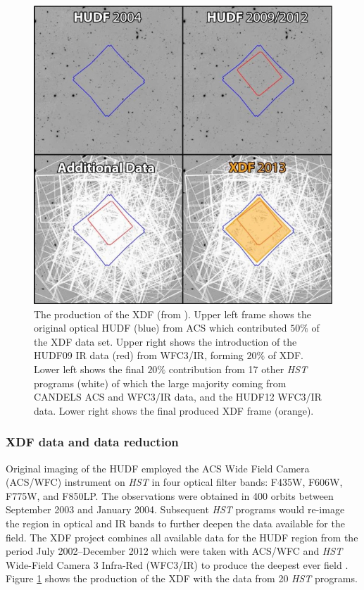 \documentclass[12pt, twocolumn, nofootinbib]{revtex4-1}    %
\begin{document}
\begin{figure}
\includegraphics[width=\linewidth]{introduction/xdf_frame.jpg}
\caption[Hubble eXtreme Deep Field]{The production of the XDF (from \cite{2013ApJS..209....6I}). Upper left frame shows the original optical HUDF (blue) from ACS which contributed $50\%$ of the XDF data set. Upper right shows the introduction of the HUDF09 IR data (red) from WFC3/IR, forming $20\%$ of XDF. Lower left shows the final $20\%$ contribution from 17 other \textit{HST} programs (white) of which the large majority coming from CANDELS ACS and WFC3/IR data, and the HUDF12 WFC3/IR data. Lower right shows the final produced XDF frame (orange).}
\label{fig:xdf_frame}
\end{figure}

\vspace{2ex} %
\subsubsection{XDF data and data reduction}
\noindent
Original imaging of the HUDF \citep{2006AJ....132.1729B} employed the ACS Wide Field Camera (ACS/WFC) instrument on \textit{HST} in four optical filter bands: F435W, F606W, F775W, and F850LP. The observations were obtained in 400 orbits between September 2003 and January 2004. Subsequent \textit{HST} programs would re-image the region in optical and IR bands to further deepen the data available for the field. The XDF project combines all available data for the HUDF region from the period July 2002--December 2012 which were taken with ACS/WFC and \textit{HST} Wide-Field Camera 3 Infra-Red (WFC3/IR) to produce the deepest ever field \citep{2013ApJS..209....6I}. Figure \ref{fig:xdf_frame} shows the production of the XDF with the data from 20 \textit{HST} programs.
\end{document}
